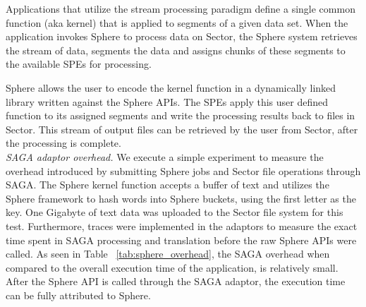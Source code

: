 \documentclass[3p,twocolumn]{elsarticle}
\begin{document}
Applications that utilize the stream processing paradigm define a
single common function (aka kernel) that is applied to segments of a
given data set.  When the application invokes Sphere to process data
on Sector, the Sphere system retrieves the stream of data, segments
the data and assigns chunks of these segments to the available SPEs
for processing.

Sphere allows the user to encode the kernel function in a dynamically
linked library written against the Sphere APIs.  The SPEs apply this
user defined function to its assigned segments and write the
processing results back to files in Sector.  This stream of output
files can be retrieved by the user from Sector, after the processing
is complete.\\


\textit{SAGA adaptor overhead.}
%
We execute a simple experiment to measure the overhead introduced by
submitting Sphere jobs and Sector file operations through SAGA.  The
Sphere kernel function accepts a buffer of text and utilizes the
Sphere framework to hash words into Sphere buckets, using the first
letter as the key. One Gigabyte of text data was uploaded to the
Sector file system for this test. %
Furthermore, traces were implemented in the adaptors to measure the
exact time spent in SAGA processing and translation before the raw
Sphere APIs were called.  As seen in Table ~\ref{tab:sphere_overhead},
the SAGA overhead when compared to the overall execution time of the
application, is relatively small. After the Sphere API is called
through the SAGA adaptor, the execution time can be fully attributed
to Sphere.
\end{document}
